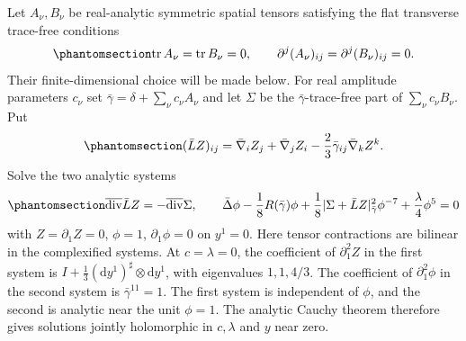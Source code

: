 \documentclass[
  english,
  11pt,
  reqno]{amsart}
\begin{document}
Let \(A_\nu,B_\nu\) be real-analytic symmetric spatial tensors
satisfying the flat transverse trace-free conditions
\begin{equation}\protect\phantomsection\label{eq:es-finite-tt-data}{
 \operatorname{tr}A_\nu=\operatorname{tr}B_\nu=0,
 \qquad \partial^j(A_\nu)_{ij}
       =\partial^j(B_\nu)_{ij}=0.
}\end{equation} Their finite-dimensional choice will be made below. For
real amplitude parameters \(c_\nu\) set
\(\bar\gamma=\delta+\sum_\nu c_\nu A_\nu\) and let \(\Sigma\) be the
\(\bar\gamma\)-trace-free part of \(\sum_\nu c_\nu B_\nu\). Put
\begin{equation}\protect\phantomsection\label{eq:es-finite-conformal-killing}{
 (\bar LZ)_{ij}
 =\bar\nabla_iZ_j+\bar\nabla_jZ_i
    -\frac23\bar\gamma_{ij}\bar\nabla_kZ^k .
}\end{equation} Solve the two analytic systems
\begin{equation}\protect\phantomsection\label{eq:es-finite-constraints}{
 \overline{\operatorname{div}}\bar LZ
       =-\overline{\operatorname{div}}\Sigma,
 \qquad
 \bar\Delta\phi-\frac18R(\bar\gamma)\phi
  +\frac18|\Sigma+\bar LZ|_{\bar\gamma}^2\phi^{-7}
  +\frac{\lambda}{4}\phi^5=0
}\end{equation} with \(Z=\partial_1Z=0\), \(\phi=1\),
\(\partial_1\phi=0\) on \(y^1=0\). Here tensor contractions are bilinear
in the complexified systems. At \(c=\lambda=0\), the coefficient of
\(\partial_1^2 Z\) in the first system is
\(I+\frac13(\mathrm dy^1)^\sharp\otimes\mathrm dy^1\), with eigenvalues
\(1,1,4/3\). The coefficient of \(\partial_1^2\phi\) in the second
system is \(\bar\gamma^{11}=1\). The first system is independent of
\(\phi\), and the second is analytic near the unit \(\phi=1\). The
analytic Cauchy theorem therefore gives solutions jointly holomorphic in
\(c,\lambda\) and \(y\) near zero.
\end{document}

